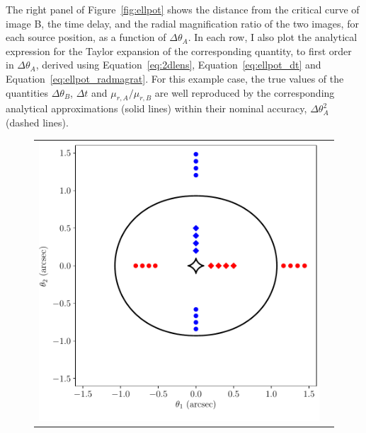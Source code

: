 \documentclass[usenatbib]{mnras}
\def\Fref#1{Figure~\ref{#1}\xspace}
\def\Eref#1{Equation~\ref{#1}\xspace}
\begin{document}
The right panel of \Fref{fig:ellpot} shows the distance from the critical curve of image B, the time delay, and the radial magnification ratio of the two images, for each source position, as a function of $\Delta\theta_A$.
In each row, I also plot the analytical expression for the Taylor expansion of the corresponding quantity, to first order in $\Delta\theta_A$, derived using \Eref{eq:2dlens}, \Eref{eq:ellpot_dt} and \Eref{eq:ellpot_radmagrat}.
For this example case, the true values of the quantities $\Delta\theta_B$, $\Delta t$ and $\mu_{r,A}/\mu_{r,B}$ are well reproduced by the corresponding analytical approximations (solid lines) within their nominal accuracy, $\Delta\theta_A^2$ (dashed lines).
%
\begin{figure}
 \begin{tabular}{cc}
 \includegraphics[width=\columnwidth]{ellpot_critcurve-eps-converted-to.pdf} &

\end{tabular}
\end{figure}
\end{document}
